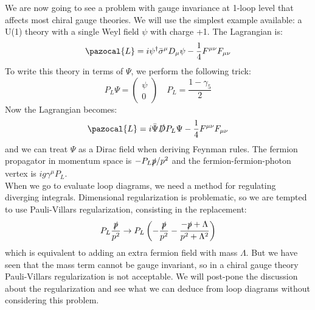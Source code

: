 \documentclass[../main.tex]{subfiles}
\begin{document}
We are now going to see a problem with gauge invariance at 1-loop level that affects most chiral gauge theories. We will use the simplest example available: a U(1) theory with a single Weyl field $\psi$ with charge +1. The Lagrangian is:
\[
\pazocal{L}=i\psi^\dagger\Bar{\sigma}^\mu D_\mu\psi-\frac{1}{4}F^{\mu\nu}F_{\mu\nu}
\]
To write this theory in terms of $\Psi$, we perform the following trick:
\[
P_L\Psi=\left(\begin{array}{c}
     \psi \\
     0 
\end{array}\right)
\quad
P_L=\frac{1-\gamma_5}{2}
\]
Now the Lagrangian becomes:
\[
\pazocal{L}=i\Bar{\Psi}\slashed{D}P_L\Psi-\frac{1}{4}F^{\mu\nu}F_{\mu\nu}
\]
and we can treat $\Psi$ as a Dirac field when deriving Feynman rules. The fermion propagator in momentum space is $-P_L\slashed{p}/p^2$ and the fermion-fermion-photon vertex is $ig\gamma^\mu P_L$.\\
When we go to evaluate loop diagrams, we need a method for regulating diverging integrals. Dimensional regularization is problematic, so we are tempted to use Pauli-Villars regularization, consisting in the replacement:
\[
P_L\frac{\slashed{p}}{p^2}\to P_L\left(-\frac{\slashed{p}}{p^2}-\frac{-\slashed{p}+\Lambda}{p^2+\Lambda^2}\right)
\]
which is equivalent to adding an extra fermion field with mass $\Lambda$. But we have seen that the mass term cannot be gauge invariant, so in a chiral gauge theory Pauli-Villars regularization is not acceptable. We will post-pone the discussion about the regularization and see what we can deduce from loop diagrams without considering this problem. 
\end{document}
